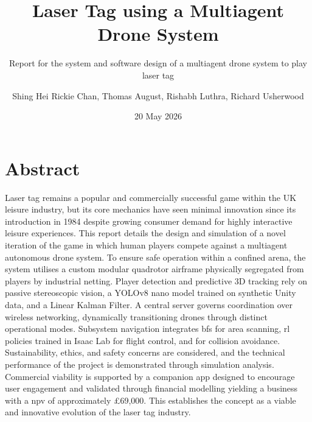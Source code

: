 \documentclass{report_template_oxford}
\title{Laser Tag using a Multiagent Drone System}
\subtitle{Report for the system and software design of a multiagent drone system to play laser tag}
\author{Shing Hei Rickie Chan, Thomas August, Rishabh Luthra, Richard Usherwood}
\date{20 May 2026}
\begin{document}
\maketitle
{}
\newpage

\section*{Abstract}



Laser tag remains a popular and commercially successful game within the UK leisure industry, but its core mechanics have seen minimal innovation since its introduction in 1984 despite growing consumer demand for highly interactive leisure experiences. This report details the design and simulation of a novel iteration of the game in which human players compete against a multiagent autonomous drone system.
To ensure safe operation within a confined arena, the system utilises a custom modular quadrotor airframe physically segregated from players by industrial netting. Player detection and predictive 3D tracking rely on passive stereoscopic vision, a YOLOv8 nano model trained on synthetic Unity data, and a Linear Kalman Filter. A central server governs coordination over wireless networking, dynamically transitioning drones through distinct operational modes.
Subsystem navigation integrates \acrfull{bfs} for area scanning, \acrfull{rl} policies trained in Isaac Lab for flight control, and  for collision avoidance.
Sustainability, ethics, and safety concerns are considered, and the technical performance of the project is demonstrated through simulation analysis. Commercial viability is supported by a companion app designed to encourage user engagement and validated through financial modelling yielding a business with a \acrfull{npv} of approximately £69,000. This establishes the concept as a viable and innovative evolution of the laser tag industry.
\end{document}
